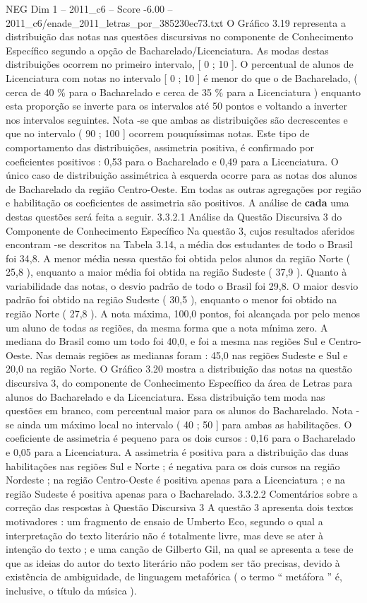 \begin{textsample}{NEG Dim 1 – 2011\_c6 – Score -6.00 – 2011\_c6/enade\_2011\_letras\_por\_385230ec73.txt}
O Gráfico 3.19 representa a distribuição das notas nas questões discursivas no componente de Conhecimento Específico segundo a opção de Bacharelado/Licenciatura.
As modas destas distribuições ocorrem no primeiro intervalo, [ 0 ; 10 ].
O percentual de alunos de Licenciatura com notas no intervalo [ 0 ; 10 ] é menor do que o de Bacharelado, ( cerca de 40 \% para o Bacharelado e cerca de 35 \% para a Licenciatura ) enquanto esta proporção se inverte para os intervalos até 50 pontos e voltando a inverter nos intervalos seguintes.
Nota -se que ambas as distribuições são decrescentes e que no intervalo ( 90 ; 100 ] ocorrem pouquíssimas notas.
Este tipo de comportamento das distribuições, assimetria positiva, é confirmado por coeficientes positivos : 0,53 para o Bacharelado e 0,49 para a Licenciatura.
O único caso de distribuição assimétrica à esquerda ocorre para as notas dos alunos de Bacharelado da região Centro-Oeste.
Em todas as outras agregações por região e habilitação os coeficientes de assimetria são positivos.
A análise de \textbf{cada} uma destas questões será feita a seguir. 3.3.2.1 Análise da Questão Discursiva 3 do Componente de Conhecimento Específico Na questão 3, cujos resultados aferidos encontram -se descritos na Tabela 3.14, a média dos estudantes de todo o Brasil foi 34,8.
A menor média nessa questão foi obtida pelos alunos da região Norte ( 25,8 ), enquanto a maior média foi obtida na região Sudeste ( 37,9 ).
Quanto à variabilidade das notas, o desvio padrão de todo o Brasil foi 29,8.
O maior desvio padrão foi obtido na região Sudeste ( 30,5 ), enquanto o menor foi obtido na região Norte ( 27,8 ).
A nota máxima, 100,0 pontos, foi alcançada por pelo menos um aluno de todas as regiões, da mesma forma que a nota mínima zero.
A mediana do Brasil como um todo foi 40,0, e foi a mesma nas regiões Sul e Centro-Oeste.
Nas demais regiões as medianas foram : 45,0 nas regiões Sudeste e Sul e 20,0 na região Norte.
O Gráfico 3.20 mostra a distribuição das notas na questão discursiva 3, do componente de Conhecimento Específico da área de Letras para alunos do Bacharelado e da Licenciatura.
Essa distribuição tem moda nas questões em branco, com percentual maior para os alunos do Bacharelado.
Nota -se ainda um máximo local no intervalo ( 40 ; 50 ] para ambas as habilitações.
O coeficiente de assimetria é pequeno para os dois cursos : 0,16 para o Bacharelado e 0,05 para a Licenciatura.
A assimetria é positiva para a distribuição das duas habilitações nas regiões Sul e Norte ; é negativa para os dois cursos na região Nordeste ; na região Centro-Oeste é positiva apenas para a Licenciatura ; e na região Sudeste é positiva apenas para o Bacharelado. 3.3.2.2 Comentários sobre a correção das respostas à Questão Discursiva 3 A questão 3 apresenta dois textos motivadores : um fragmento de ensaio de Umberto Eco, segundo o qual a interpretação do texto literário não é totalmente livre, mas deve se ater à intenção do texto ; e uma canção de Gilberto Gil, na qual se apresenta a tese de que as ideias do autor do texto literário não podem ser tão precisas, devido à existência de ambiguidade, de linguagem metafórica ( o termo “ metáfora ” é, inclusive, o título da música ).

\end{textsample}
